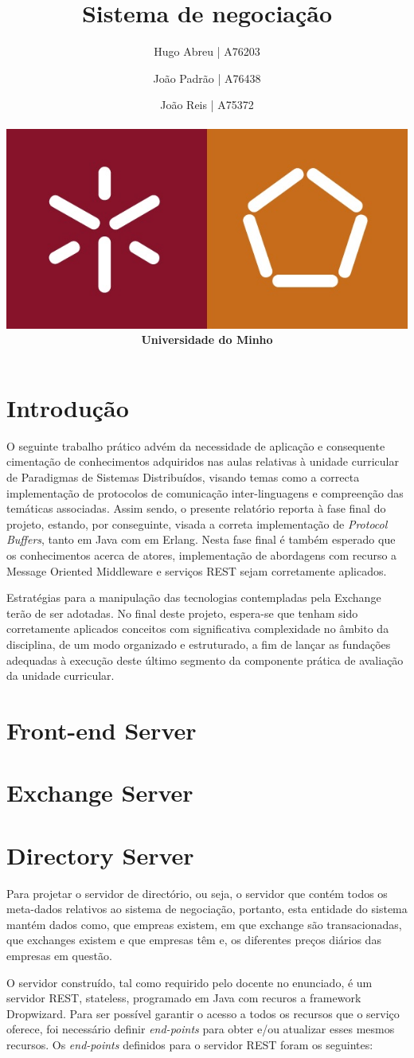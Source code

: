 \documentclass[a4paper,12pt]{article}
\title{Sistema de negociação}
\author{Hugo Abreu | A76203 \and João Padrão | A76438\and João Reis | A75372
\\\\ \includegraphics[scale=0.25]{um_eeng} \\ \textbf{Universidade do Minho}}
\begin{document}
\maketitle


\section{Introdução}
O seguinte trabalho prático advém da necessidade de aplicação e consequente cimentação de conhecimentos adquiridos nas aulas relativas à unidade curricular de Paradigmas de Sistemas Distribuídos, visando temas como a correcta implementação de protocolos de comunicação inter-linguagens e compreenção das temáticas associadas. Assim sendo, o presente relatório reporta à fase final do projeto, estando, por conseguinte, visada a correta implementação de \textit{Protocol Buffers}, tanto em Java com em Erlang. Nesta fase final é também esperado que os conhecimentos acerca de atores, implementação de abordagens com recurso a Message Oriented Middleware e serviços REST sejam corretamente aplicados. 
\par Estratégias para a manipulação das tecnologias contempladas pela Exchange terão de ser adotadas. No final deste projeto, espera-se que tenham sido corretamente aplicados conceitos com significativa complexidade no âmbito da disciplina, de um modo organizado e estruturado, a fim de lançar as fundações adequadas à execução deste último segmento da componente prática de avaliação da unidade curricular.

\section{Front-end Server}

\section{Exchange Server}

\section{Directory Server}
Para projetar o servidor de directório, ou seja, o servidor que contém todos os meta-dados relativos ao sistema de negociação, portanto, esta entidade do sistema mantém dados como, que empreas existem, em que exchange são transacionadas, que exchanges existem e que empresas têm e, os diferentes preços diários das empresas em questão.
\par O servidor construído, tal como requirido pelo docente no enunciado, é um servidor REST, stateless, programado em Java com recuros a framework Dropwizard. Para ser possível garantir o acesso a todos os recursos que o serviço oferece, foi necessário definir \textit{end-points} para obter e/ou atualizar esses mesmos recursos. Os \textit{end-points} definidos para o servidor REST foram os seguintes:
\end{document}
